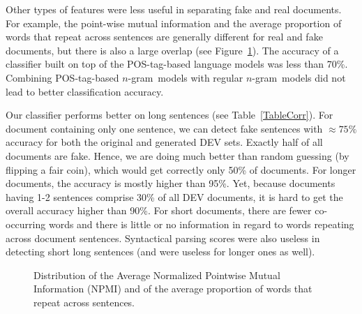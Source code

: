 \documentclass[11pt]{article}
\newcommand{\ngram}{\mbox{$n$-gram }}
\begin{document}
Other types of features were less useful in separating fake and real documents. For example,
the point-wise mutual information 
and the average proportion of words that repeat across sentences are generally different for real and fake documents,
but there is also a large overlap (see Figure~\ref{FigNPMI}). 
The accuracy of a classifier built on top of the POS-tag-based language models
was less than 70\%. Combining POS-tag-based \ngram models with regular \ngram models did not lead
to better classification accuracy.


Our classifier performs better on long sentences (see Table~\ref{TableCorr}).
For document containing only one sentence, we can detect fake sentences with $\approx 75\%$ accuracy
for both the original and generated DEV sets.
Exactly half of all documents are fake. Hence, we are doing much
better than random guessing (by flipping a fair coin), which would get correctly only 50\% of documents.
For longer documents, the accuracy is mostly higher than 95\%.
Yet, because documents having 1-2 sentences comprise 30\% of all DEV documents,
it is hard to get the overall accuracy higher than 90\%.
For short documents, 
there are fewer co-occurring words and there is little or no information in regard to words repeating
across document sentences. 
Syntactical parsing scores were also useless in detecting short long sentences (and were useless
for longer ones as well).


\begin{figure}[ht]
\centering
\caption{Distribution of the Average Normalized Pointwise Mutual Information (NPMI) and 
of the average proportion of words that repeat across sentences.\label{FigNPMI}}
\end{figure}
\end{document}
